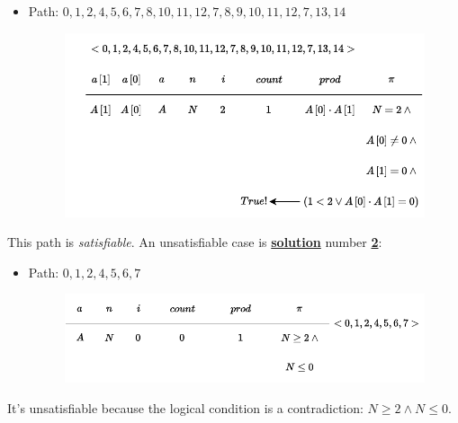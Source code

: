 \begin{itemize}
    \item Path: $0, 1, 2, 4, 5, 6, 7, 8, 10, 11, 12, 7, 8, 9, 10, 11, 12, 7, 13, 14$
    \begin{figure}[!htp]
        \centering
        \includegraphics[width=.8\textwidth]{img/symbolic-execution-15.pdf}
    \end{figure}
\end{itemize}
This path is \emph{satisfiable}. An unsatisfiable case is \textbf{\underline{solution}} number \textbf{\underline{2}}:
\begin{itemize}
    \item Path: $0, 1, 2, 4, 5, 6, 7$
    \begin{figure}[!htp]
        \centering
        \includegraphics[width=\textwidth]{img/symbolic-execution-16.pdf}
    \end{figure}
\end{itemize}
It's unsatisfiable because the logical condition is a contradiction: $N \ge 2 \land N \le 0$.